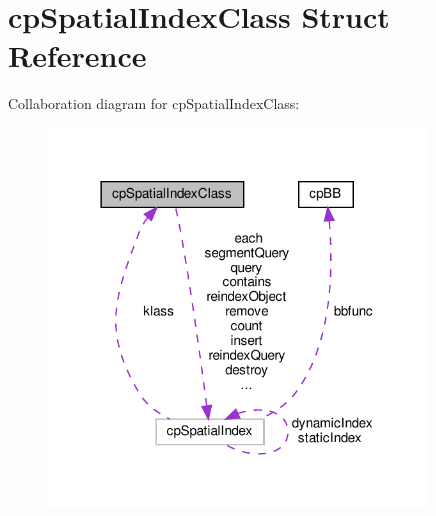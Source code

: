 \hypertarget{structcpSpatialIndexClass}{}\section{cp\+Spatial\+Index\+Class Struct Reference}
\label{structcpSpatialIndexClass}


Collaboration diagram for cp\+Spatial\+Index\+Class\+:
\nopagebreak
\begin{figure}[H]
\begin{center}
\leavevmode
\includegraphics[width=285pt]{structcpSpatialIndexClass__coll__graph}
\end{center}
\end{figure}
